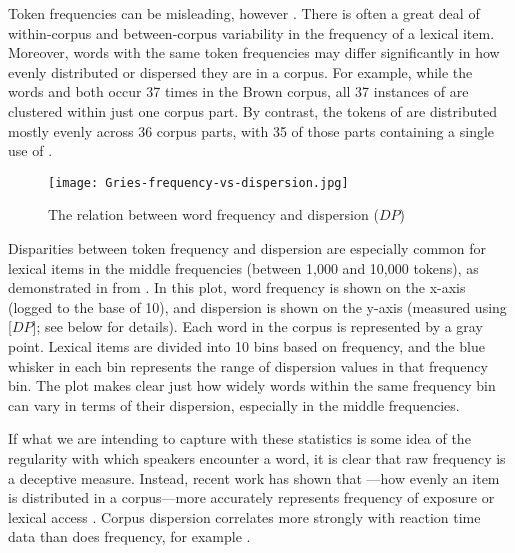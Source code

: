 Token frequencies can be misleading, however \parencites{Gries2008}{Gries2021}{Griesfc}. There is often a great deal of within-corpus and between-corpus variability in the frequency of a lexical item. Moreover, words with the same token frequencies may differ significantly in how evenly distributed or dispersed they are in a corpus. For example, while the words  and  both occur 37 times in the Brown corpus, all 37 instances of  are clustered within just one corpus part. By contrast, the tokens of  are distributed mostly evenly across 36 corpus parts, with 35 of those parts containing a single use of  \parencite[100]{Gries2021}.

\begin{figure}
  \texttt{[image: Gries-frequency-vs-dispersion.jpg]}
  \caption[The relation between word frequency and dispersion (DP)]{The relation between word frequency and dispersion ($DP$) }
  \label{fig:Gries-frequency-vs-dispersion}
\end{figure}

Disparities between token frequency and dispersion are especially common for lexical items in the middle frequencies (between 1,000 and 10,000 tokens), as demonstrated in  from \textcite[112]{Gries2021}. In this plot, word frequency is shown on the x-axis (logged to the base of 10), and dispersion is shown on the y-axis (measured using  [$DP$]; see below for details). Each word in the corpus is represented by a gray point. Lexical items are divided into 10 bins based on frequency, and the blue whisker in each bin represents the range of dispersion values in that frequency bin. The plot makes clear just how widely words within the same frequency bin can vary in terms of their dispersion, especially in the middle frequencies.

If what we are intending to capture with these statistics is some idea of the regularity with which speakers encounter a word, it is clear that raw frequency is a deceptive measure. Instead, recent work has shown that —how evenly an item is distributed in a corpus—more accurately represents frequency of exposure or lexical access \parencites{Gries2008}{Gries2010}{Griesfc}. Corpus dispersion correlates more strongly with reaction time data than does frequency, for example \parencite{Griesfc}.

